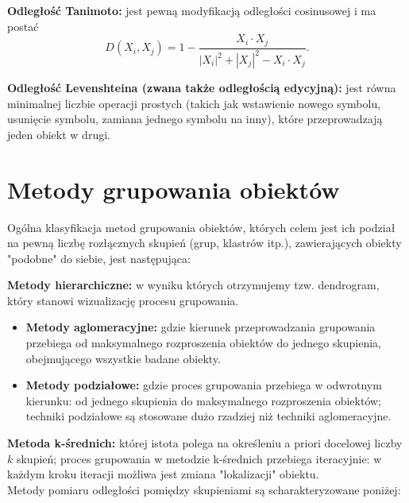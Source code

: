 \documentclass{article}
\begin{document}
\textbf{Odległość Tanimoto:} jest pewną modyfikacją odległości cosinusowej i ma postać
\begin{equation}
    D(X_i, X_j) = 1 - \frac{X_i \cdot X_j}{|X_i|^2 + |X_j|^2 - X_i \cdot X_j}. \tag{2}
\end{equation}

\textbf{Odległość Levenshteina (zwana także odległością edycyjną):} jest równa minimalnej liczbie operacji prostych (takich jak wstawienie nowego symbolu, usunięcie symbolu, zamiana jednego symbolu na inny), które przeprowadzają jeden obiekt w drugi.

\section{Metody grupowania obiektów}

Ogólna klasyfikacja metod grupowania obiektów, których celem jest ich podział na pewną liczbę rozłącznych skupień (grup, klastrów itp.), zawierających obiekty "podobne" do siebie, jest następująca:

\textbf{Metody hierarchiczne:} w wyniku których otrzymujemy tzw. dendrogram, który stanowi wizualizację procesu grupowania.

\begin{itemize}
    \item \textbf{Metody aglomeracyjne:} gdzie kierunek przeprowadzania grupowania przebiega od maksymalnego rozproszenia obiektów do jednego skupienia, obejmującego wszystkie badane obiekty.
    \item \textbf{Metody podziałowe:} gdzie proces grupowania przebiega w odwrotnym kierunku: od jednego skupienia do maksymalnego rozproszenia obiektów; techniki podziałowe są stosowane dużo rzadziej niż techniki aglomeracyjne.
\end{itemize}

\textbf{Metoda k-średnich:} której istota polega na określeniu a priori docelowej liczby \(k\) skupień; proces grupowania w metodzie k-średnich przebiega iteracyjnie: w każdym kroku iteracji możliwa jest zmiana "lokalizacji" obiektu. \\

Metody pomiaru odległości pomiędzy skupieniami są scharakteryzowane poniżej:
\end{document}
